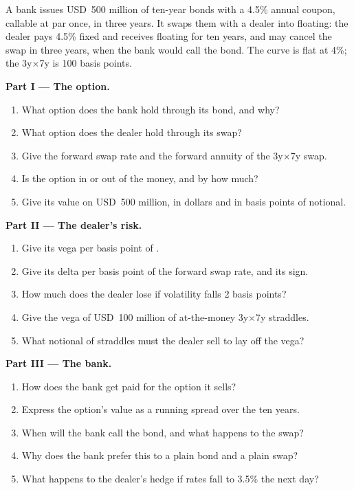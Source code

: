 \begin{problem}\label{pb:m2:the-rates-options-market:1}
A bank issues USD~500 million of ten-year bonds with a 4.5\% annual coupon,
callable at par once, in three years. It swaps them with a dealer into
floating: the dealer pays 4.5\% fixed and receives floating for ten years, and
may cancel the swap in three years, when the bank would call the bond. The
curve is flat at 4\%; the 3y$\times$7y  is 100 basis points.

\medskip\noindent\textbf{Part I --- The option.}
\begin{enumerate}
\item What option does the bank hold through its bond, and why?
\item What option does the dealer hold through its swap?
\item Give the forward swap rate and the forward annuity of the 3y$\times$7y swap.
\item Is the option in or out of the money, and by how much?
\item Give its value on USD~500 million, in dollars and in basis points of notional.
\end{enumerate}

\medskip\noindent\textbf{Part II --- The dealer's risk.}
\begin{enumerate}[resume]
\item Give its vega per basis point of .
\item Give its delta per basis point of the forward swap rate, and its sign.
\item How much does the dealer lose if volatility falls 2 basis points?
\item Give the vega of USD~100 million of at-the-money 3y$\times$7y straddles.
\item What notional of straddles must the dealer sell to lay off the vega?
\end{enumerate}

\medskip\noindent\textbf{Part III --- The bank.}
\begin{enumerate}[resume]
\item How does the bank get paid for the option it sells?
\item Express the option's value as a running spread over the ten years.
\item When will the bank call the bond, and what happens to the swap?
\item Why does the bank prefer this to a plain bond and a plain swap?
\item What happens to the dealer's hedge if rates fall to 3.5\% the next day?
\end{enumerate}


\end{problem}
